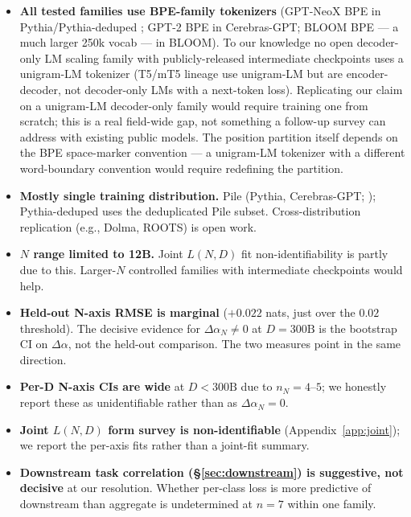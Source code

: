 \documentclass[10pt]{article}
\newcommand{\dalpha}{\Delta\alpha}
\begin{document}
\begin{itemize}
  \item \textbf{All tested families use BPE-family tokenizers} (GPT-NeoX
        BPE in Pythia/Pythia-deduped \citep{black2022gptneox}; GPT-2 BPE
        in Cerebras-GPT; BLOOM BPE --- a much larger 250k vocab --- in
        BLOOM). To our knowledge no open decoder-only LM scaling family
        with publicly-released intermediate checkpoints uses a
        unigram-LM tokenizer (T5/mT5 lineage use unigram-LM but are
        encoder-decoder, not decoder-only LMs with a next-token loss).
        Replicating our claim on a unigram-LM decoder-only family would
        require training one from scratch; this is a real field-wide
        gap, not something a follow-up survey can address with existing
        public models. The position partition itself depends on the BPE
        space-marker convention --- a unigram-LM tokenizer with a
        different word-boundary convention would require redefining the
        partition.
  \item \textbf{Mostly single training distribution.} Pile (Pythia,
        Cerebras-GPT; \citealp{gao2020pile}); Pythia-deduped uses the
        deduplicated Pile subset. Cross-distribution replication (e.g.,
        Dolma, ROOTS) is open work.
  \item \textbf{$N$ range limited to 12B.} Joint $L(N, D)$ fit
        non-identifiability is partly due to this. Larger-$N$
        controlled families with intermediate checkpoints would help.
  \item \textbf{Held-out N-axis RMSE is marginal} ($+0.022$ nats, just
        over the $0.02$ threshold). The decisive evidence for
        $\dalpha_N \neq 0$ at $D{=}300\text{B}$ is the bootstrap CI on
        $\dalpha$, not the held-out comparison. The two measures point
        in the same direction.
  \item \textbf{Per-D N-axis CIs are wide} at $D < 300\text{B}$ due to
        $n_N = 4$--$5$; we honestly report these as unidentifiable
        rather than as $\dalpha_N = 0$.
  \item \textbf{Joint $L(N, D)$ form survey is non-identifiable}
        (Appendix~\ref{app:joint}); we report the per-axis fits rather
        than a joint-fit summary.
  \item \textbf{Downstream task correlation (\S\ref{sec:downstream})
        is suggestive, not decisive} at our resolution. Whether
        per-class loss is more predictive of downstream than aggregate
        is undetermined at $n{=}7$ within one family.

\end{itemize}
\end{document}
